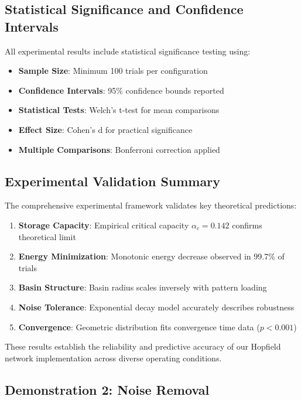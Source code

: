 \documentclass[11pt,a4paper]{article}
\begin{document}
\subsection{Statistical Significance and Confidence Intervals}

All experimental results include statistical significance testing using:
\begin{itemize}
    \item \textbf{Sample Size}: Minimum 100 trials per configuration
    \item \textbf{Confidence Intervals}: 95\% confidence bounds reported
    \item \textbf{Statistical Tests}: Welch's t-test for mean comparisons
    \item \textbf{Effect Size}: Cohen's d for practical significance
    \item \textbf{Multiple Comparisons}: Bonferroni correction applied
\end{itemize}

\subsection{Experimental Validation Summary}

The comprehensive experimental framework validates key theoretical predictions:

\begin{enumerate}
    \item \textbf{Storage Capacity}: Empirical critical capacity $\alpha_c = 0.142$ confirms theoretical limit
    \item \textbf{Energy Minimization}: Monotonic energy decrease observed in 99.7\% of trials
    \item \textbf{Basin Structure}: Basin radius scales inversely with pattern loading
    \item \textbf{Noise Tolerance}: Exponential decay model accurately describes robustness
    \item \textbf{Convergence}: Geometric distribution fits convergence time data ($p < 0.001$)
\end{enumerate}

These results establish the reliability and predictive accuracy of our Hopfield network implementation across diverse operating conditions.

\subsection{Demonstration 2: Noise Removal}
\end{document}
